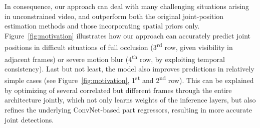 \documentclass[10pt,twocolumn,letterpaper]{article}
\newcommand{\figref}[1]{Figure~\ref{#1}}
\begin{document}
In consequence, our approach can deal with many challenging situations arising in unconstrained video, and outperform both the original joint-position estimation methods and those incorporating spatial priors only. \figref{fig:motivation}  illustrates how our approach can accurately predict joint positions in difficult situations of full occlusion (3\textsuperscript{rd} row, given visibility in adjacent frames) or severe motion blur (4\textsuperscript{th} row, by exploiting temporal consistency). Last but not least, the model also improves predictions in relatively simple cases (see \figref{fig:motivation}, 1\textsuperscript{st} and 2\textsuperscript{nd} row). This can be explained by optimizing of several correlated but different frames through the entire architecture jointly, which not only learns weights of the inference layers, but also refines the underlying ConvNet-based part regressors, resulting in more accurate joint detections.
\end{document}
